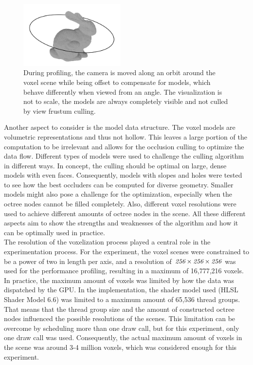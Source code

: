 \begin{figure}[h]
    \centering
    \includegraphics[width=200px]{images/graphics/test-anim-camera-path.jpg}
    \caption{During profiling, the camera is moved along an orbit around the voxel scene while being offset to compensate 
    for models, which behave differently when viewed from an angle. The visualization is not to scale, the models 
    are always completely visible and not culled by view frustum culling.}
    \label{fig:test-anim-camera-path}
\end{figure}

Another aspect to consider is the model data structure. The voxel models are volumetric representations and thus 
not hollow. This leaves a large portion of the computation to be irrelevant and allows for the occlusion culling to 
optimize the data flow. Different types of models were used to challenge the culling algorithm in different ways. 
In concept, the culling should be optimal on large, dense models with even faces. Consequently, models with 
slopes and holes were tested to see how the best occluders can be computed for diverse geometry. Smaller models might 
also pose a challenge for the optimization, especially when the octree nodes cannot be filled completely. Also, 
different voxel resolutions were used to achieve different amounts of octree nodes in the scene. All these different 
aspects aim to show the strengths and weaknesses of the algorithm and how it can be optimally used in practice. \\

\noindent
The resolution of the voxelization process played a central role in the experimentation process.
For the experiment, the voxel scenes were constrained to be a power of two in length per axis, and a resolution 
of $\emph{256} \times \emph{256} \times \emph{256}$ was used for the performance profiling, resulting in a maximum 
of 16,777,216 voxels. In practice, the maximum amount of voxels was limited by how the data was dispatched 
by the \ac{GPU}. In the implementation, the shader model used (HLSL Shader Model 6.6) was limited to a maximum 
amount of 65,536 thread groups. That means that the thread group size and the amount of constructed octree nodes 
influenced the possible resolutions of the scenes. This limitation can be overcome by scheduling more than one draw 
call, but for this experiment, only one draw call was used. Consequently, the actual maximum amount of voxels in the 
scene was around 3-4 million voxels, which was considered enough for this experiment.


